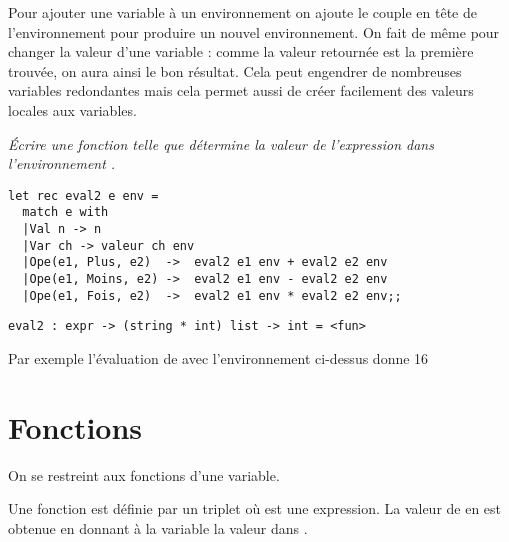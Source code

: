 Pour ajouter une variable à un environnement on ajoute le couple  en tête de l'environnement pour produire un nouvel environnement. On fait de même pour changer la valeur d'une variable : comme la valeur retournée est la première trouvée, on aura ainsi le bon résultat. Cela peut engendrer de nombreuses variables redondantes mais cela permet aussi de créer facilement des valeurs locales aux variables.
\begin{Exercise}\it
Écrire une fonction  
telle que  détermine la valeur de l'expression  dans l'environnement .
\end{Exercise}
\begin{Answer}
\begin{lstlisting}
let rec eval2 e env =
  match e with
  |Val n -> n
  |Var ch -> valeur ch env
  |Ope(e1, Plus, e2)  ->  eval2 e1 env + eval2 e2 env
  |Ope(e1, Moins, e2) ->  eval2 e1 env - eval2 e2 env
  |Ope(e1, Fois, e2)  ->  eval2 e1 env * eval2 e2 env;;
\end{lstlisting} 
\end{Answer}
\begin{lstlisting}
eval2 : expr -> (string * int) list -> int = <fun>
\end{lstlisting}
\medskip

Par exemple l'évaluation de  avec l'environnement ci-dessus donne 16
\newpage
\section{Fonctions}
On se restreint aux fonctions d'une variable.

Une fonction est définie par un triplet  où  est une expression. La valeur de  en  est obtenue en donnant à la variable  la valeur  dans .

